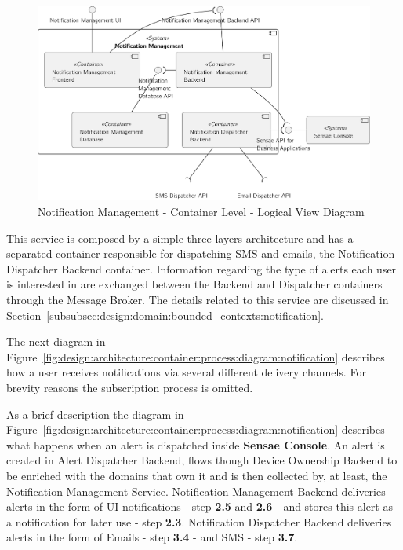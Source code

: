 \begin{figure}[H]
   \centering
   \includegraphics[page=1,width=0.8\columnwidth]{assets/diagrams/design/architectural/level2/logical/notification-management-context.pdf}
   \caption[Notification Management - Container Level - Logical View Diagram]{Notification Management - Container Level - Logical View Diagram}
   \label{fig:design:architecture:solutions:containers:logical:noti}
\end{figure}

This service is composed by a simple three layers architecture and has a separated container responsible for dispatching SMS and emails, the Notification Dispatcher Backend container. Information regarding the type of alerts each user is interested in are exchanged between the Backend and Dispatcher containers through the Message Broker. The details related to this service are discussed in Section~\ref{subsubsec:design:domain:bounded_contexts:notification}.

The next diagram in Figure~\ref{fig:design:architecture:container:process:diagram:notification} describes how a user receives notifications via several different delivery channels. For brevity reasons the subscription process is omitted.

As a brief description the diagram in Figure~\ref{fig:design:architecture:container:process:diagram:notification} describes what happens when an alert is dispatched inside \textbf{Sensae Console}. An alert is created in Alert Dispatcher Backend, flows though Device Ownership Backend to be enriched with the domains that own it and is then collected by, at least, the Notification Management Service. Notification Management Backend deliveries alerts in the form of \gls{UI} notifications - step \textbf{2.5} and \textbf{2.6} - and stores this alert as a notification for later use - step \textbf{2.3}. Notification Dispatcher Backend deliveries alerts in the form of Emails - step \textbf{3.4} - and SMS - step \textbf{3.7}.

